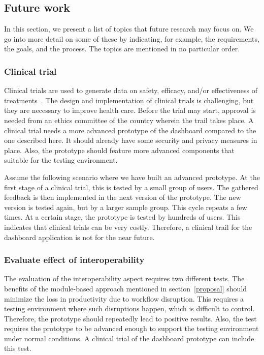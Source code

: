     \subsection{Future work}\label{future_work}

    In this section, we present a list of topics that future research may focus on. We go into more detail on some of these by indicating, for example, the requirements, the goals, and the process. The topics are mentioned in no particular order.

    \subsubsection{Clinical trial}

    Clinical trials are used to generate data on safety, efficacy, and/or effectiveness of treatments~\cite{Minneci2018}. The design and implementation of clinical trials is challenging, but they are necessary to improve health care. Before the trial may start, approval is needed from an ethics committee of the country wherein the trail takes place. A clinical trial needs a more advanced prototype of the dashboard compared to the one described here. It should already have some security and privacy measures in place. Also, the prototype should feature more advanced components that suitable for the testing environment.

    Assume the following scenario where we have built an advanced prototype. At the first stage of a clinical trial, this is tested by a small group of users. The gathered feedback is then implemented in the next version of the prototype. The new version is tested again, but by a larger sample group. This cycle repeats a few times. At a certain stage, the prototype is tested by hundreds of users. This indicates that clinical trials can be very costly. Therefore, a clinical trail for the dashboard application is not for the near future.

    \subsubsection{Evaluate effect of interoperability}

    The evaluation of the interoperability aspect requires two different tests. The benefits of the module-based approach mentioned in section~\ref{proposal} should minimize the loss in productivity due to workflow disruption. This requires a testing environment where such disruptions happen, which is difficult to control. Therefore, the prototype should repeatedly lead to positive results. Also, the test requires the prototype to be advanced enough to support the testing environment under normal conditions. A clinical trial of the dashboard prototype can include this test.


